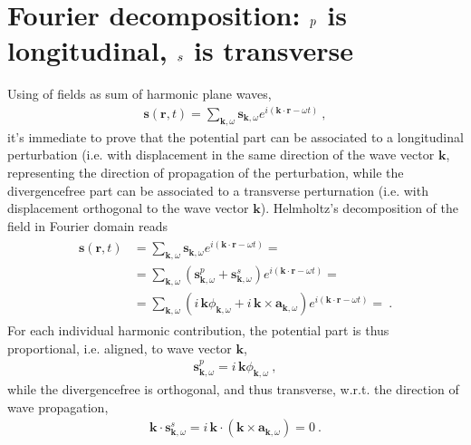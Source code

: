 \documentclass[letterpaper,10pt,english]{jupyterBook}
\begin{document}
\section{Fourier decomposition: \protect\(p\protect\) is longitudinal, \protect\(s\protect\) is transverse}
\label{\detokenize{ch/solids/small-displacements-waves:fourier-decomposition-p-is-longitudinal-s-is-transverse}}
\sphinxAtStartPar
Using  of fields as sum of harmonic plane waves,
\begin{equation*}
\begin{split}\mathbf{s}(\mathbf{r},t) = \sum_{\mathbf{k},\omega} \mathbf{s}_{\mathbf{k},\omega} e^{i\left( \mathbf{k} \cdot \mathbf{r}- \omega t \right)} \ ,\end{split}
\end{equation*}
\sphinxAtStartPar
it’s immediate to prove that the potential part can be associated to a longitudinal perturbation (i.e. with displacement in the same direction of the wave vector \(\mathbf{k}\), representing the direction of propagation of  the perturbation, while the divergence\sphinxhyphen{}free part can be associated to a transverse perturnation (i.e. with displacement orthogonal to the wave vector \(\mathbf{k}\)). Helmholtz’s decomposition of the field in Fourier domain reads
\begin{equation*}
\begin{split}\begin{aligned}
\mathbf{s}(\mathbf{r},t) 
  & = \sum_{\mathbf{k},\omega} \mathbf{s}_{\mathbf{k},\omega} e^{i\left( \mathbf{k} \cdot \mathbf{r}- \omega t \right)} = \\
  & = \sum_{\mathbf{k},\omega} \left( \mathbf{s}^p_{\mathbf{k},\omega} + \mathbf{s}^s_{\mathbf{k}, \omega} \right) e^{i\left( \mathbf{k} \cdot \mathbf{r}- \omega t \right)} = \\
  & = \sum_{\mathbf{k},\omega} \left( i \, \mathbf{k} \phi_{\mathbf{k},\omega} + i \, \mathbf{k} \times \mathbf{a}_{\mathbf{k}, \omega} \right) e^{i\left( \mathbf{k} \cdot \mathbf{r}- \omega t \right)} = \ .
\end{aligned}\end{split}
\end{equation*}
\sphinxAtStartPar
For each individual harmonic contribution, the potential part is thus proportional, i.e. aligned, to wave vector \(\mathbf{k}\),
\begin{equation*}
\begin{split}\mathbf{s}^p_{\mathbf{k},\omega} = i \,\mathbf{k} \phi_{\mathbf{k},\omega}  \ ,\end{split}
\end{equation*}
\sphinxAtStartPar
while the divergence\sphinxhyphen{}free is orthogonal, and thus transverse, w.r.t. the direction of wave propagation,
\begin{equation*}
\begin{split}\mathbf{k} \cdot \mathbf{s}^s_{\mathbf{k},\omega} = i \, \mathbf{k} \cdot  \left( \mathbf{k} \times \mathbf{a}_{\mathbf{k}, \omega} \right) = 0 \ .\end{split}
\end{equation*}
\sphinxstepscope
\end{document}
